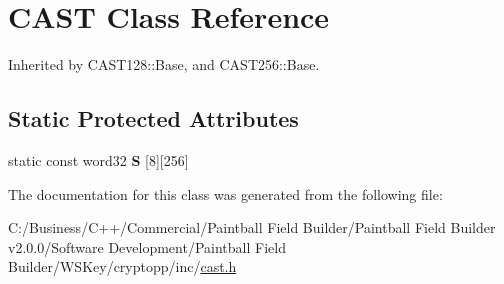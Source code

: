 \hypertarget{class_c_a_s_t}{
\section{CAST Class Reference}
\label{class_c_a_s_t}
}


Inherited by CAST128::Base, and CAST256::Base.\subsection*{Static Protected Attributes}
\begin{DoxyCompactItemize}
\item 
\hypertarget{class_c_a_s_t_a9083dfeacec36110bcc44358497e0be3}{
static const word32 {\bfseries S} \mbox{[}8\mbox{]}\mbox{[}256\mbox{]}}
\label{class_c_a_s_t_a9083dfeacec36110bcc44358497e0be3}

\end{DoxyCompactItemize}


The documentation for this class was generated from the following file:\begin{DoxyCompactItemize}
\item 
C:/Business/C++/Commercial/Paintball Field Builder/Paintball Field Builder v2.0.0/Software Development/Paintball Field Builder/WSKey/cryptopp/inc/\hyperlink{cast_8h}{cast.h}\end{DoxyCompactItemize}
